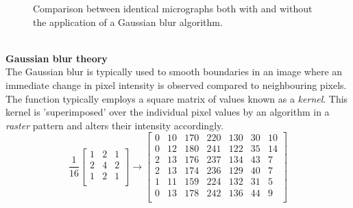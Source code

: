 \documentclass{article}
\begin{document}
	\begin{figure}[!tbp]
		\centering
		\hfill
		\caption{Comparison between identical micrographs both with and without the application of a Gaussian blur algorithm.}
		\label{fig:blur_notblur}
	\end{figure}
	\\
	\textbf{Gaussian blur theory}
	\\
	The Gaussian blur is typically used to smooth boundaries in an image where an immediate change in pixel intensity is observed compared to neighbouring pixels. The function typically employs a square matrix of values known as a \textit{kernel}. This kernel is 'superimposed' over the individual pixel values by an algorithm in a \textit{raster} pattern and alters their intensity accordingly.
	\[
	\frac{1}{16}
	\begin{bmatrix} 
		1 & 2 & 1 \\
		2 & 4 & 2\\
		1 & 2 & 1 \\
	\end{bmatrix}
	\longrightarrow
	\begin{bmatrix}
		0 & 10 & 170 & 220 & 130 & 30 & 10\\
		0 & 12 & 180 & 241 & 122 & 35 & 14\\
		2 & 13 & 176 & 237 & 134 & 43 & 7\\
		2 & 13 & 174 & 236 & 129 & 40 & 7\\
		1 & 11 & 159 & 224 & 132 & 31 & 5\\
		0 & 13 & 178 & 242 & 136 & 44 & 9\\
	\end{bmatrix}
	\]
\end{document}
